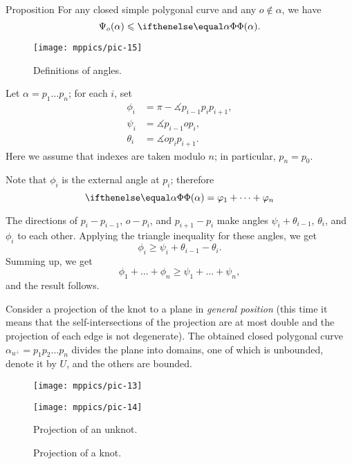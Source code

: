 \begin{thm}{Proposition}\label{prop:angular-length}
For any closed simple polygonal curve and any $o\notin\alpha$, we have 
\[\Psi_o(\alpha)\le \tc{\alpha}.\]
\end{thm}

\begin{wrapfigure}{r}{45 mm}
\vskip-7mm
\centering
\texttt{[image: mppics/pic-15]}
\caption*{Definitions of angles.}
\vskip0mm
\end{wrapfigure}

Let $\alpha=p_1\dots p_n$; for each $i$, set 
\begin{align*}
\phi_i&=\pi-\measuredangle p_{i-1}p_ip_{i+1},
\\
\psi_i&=\measuredangle p_{i-1} o p_{i},
\\
\theta_i&=\measuredangle o p_i p_{i+1}.
\end{align*}
Here we assume that indexes are taken modulo $n$; in particular, $p_{n}=p_0$.

Note that $\phi_i$ is the external angle at $p_i$;
therefore 
\[\tc\alpha= \phi_1+\dots+\phi_n\]

The directions of $p_i-p_{i-1}$, $o-p_i$, and $p_{i+1}-p_i$ make angles 
$\psi_i+\theta_{i-1}$, $\theta_i$, and $\phi_i$ to each other.
Applying the triangle inequality for these angles, we get
\[\phi_i\ge \psi_i+\theta_{i-1}-\theta_i.\]
Summing up, we get
\[\phi_1+\dots+\phi_n\ge \psi_1+\dots+\psi_n,\]
and the result follows.
\qeds

Consider a projection of the knot to a plane in \emph{general position}
(this time it means that the self-intersections of the projection are at most double and the projection of each edge is not degenerate).
The obtained closed polygonal curve $\alpha_{u^\perp}=p_1p_2\dots p_n$ divides the plane into domains, one of which is unbounded, denote it by $U$, and the others are bounded.

\begin{figure}[!ht]
\begin{minipage}{.48\textwidth}
\centering
\texttt{[image: mppics/pic-13]}
\end{minipage}\hfill
\begin{minipage}{.48\textwidth}
\centering
\texttt{[image: mppics/pic-14]}
\end{minipage}

\medskip

\begin{minipage}{.48\textwidth}
\centering
\caption*{Projection of an unknot.}
\end{minipage}\hfill
\begin{minipage}{.48\textwidth}
\centering
\caption*{Projection of a knot.}
\end{minipage}
\vskip-4mm
\end{figure}

